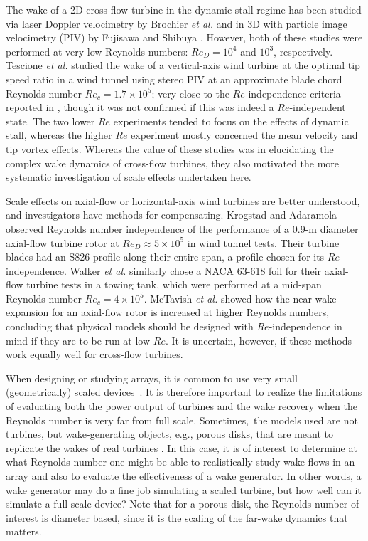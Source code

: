 \documentclass[energies,article,accept,moreauthors,pdftex,10pt,a4paper]{mdpi}
\theoremstyle{mdpi}
\newcounter{ex}
\newcounter{re}
\begin{document}
The wake of a 2D cross-flow turbine in the dynamic stall regime has been
studied via laser Doppler velocimetry by Brochier \emph{et al.} \cite{Brochier1986} and
in 3D with particle image velocimetry (PIV) by Fujisawa and Shibuya
\cite{Fujisawa2001}. However, both of these studies were performed at very low
Reynolds numbers: $Re_D = 10^4$ and $10^3$, respectively. Tescione \emph{et al.}
\cite{Tescione2014} studied the wake of a vertical-axis wind turbine at the optimal
tip speed ratio in a wind tunnel using stereo PIV at an approximate blade chord
Reynolds number $Re_c = 1.7 \times 10^5$; very close to the $Re$-independence
criteria reported in \cite{Bachant2014}, though it was not confirmed if this was
indeed a $Re$-independent state. The two lower $Re$ experiments tended to focus
on the effects of dynamic stall, whereas the higher $Re$ experiment mostly
concerned the mean velocity and tip vortex effects. Whereas the value of these
studies was in elucidating the complex wake dynamics of cross-flow turbines,
they also motivated the more systematic investigation of scale effects
undertaken here.

Scale effects on axial-flow or horizontal-axis wind turbines are better
understood, and investigators have methods for compensating. Krogstad and
Adaramola \cite{Krogstad2012a} observed Reynolds number independence of the
performance of a 0.9-m diameter axial-flow turbine rotor at $Re_D \approx 5
\times 10^5$ in wind tunnel tests. Their turbine blades had an S826 profile
along their entire span, a profile chosen for its $Re$-independence. Walker \emph{et
al.} \cite{Walker2014} similarly chose a NACA 63-618 foil for their axial-flow
turbine tests in a towing tank, which were performed at a mid-span Reynolds
number $Re_c = 4 \times 10^5$. McTavish \emph{et al.} \cite{McTavish2013} showed how
the near-wake expansion for an axial-flow rotor is increased at higher Reynolds
numbers, concluding that physical models should be designed with
$Re$-independence in mind if they are to be run at low $Re$. It is uncertain,
however, if these methods work equally well for cross-flow turbines.

When designing or studying arrays, it is common to use very small
(geometrically) scaled \mbox{devices \cite{Chamorro2011, Chamorro2011b}}. It is
therefore important to realize the limitations of evaluating both the power
output of turbines and the wake recovery when the Reynolds number is very far from
full scale. Sometimes,~the models used are not turbines, but wake-generating objects,
e.g., porous disks, that are meant to replicate the wakes of real turbines
\cite{Goldenberg1983}. In this case, it is of interest to determine at what
Reynolds number one might be able to realistically study wake flows in an array
and also to evaluate the effectiveness of a wake generator. In other words, a
wake generator may do a fine job simulating a scaled turbine, but how well can
it simulate a full-scale device? Note that for a porous disk, the Reynolds
number of interest is diameter based, since it is the scaling of the far-wake
dynamics that~ matters.
\end{document}
